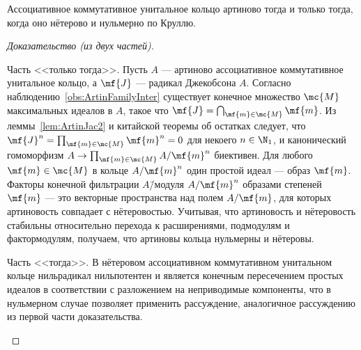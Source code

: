 \documentclass[
	extrafontsizes,
	11pt,
	hyphens,
]{memoir}
\begin{document}

\begin{theorem}
Ассоциативное коммутативное унитальное кольцо артиново тогда и только тогда, когда оно нётерово и нульмерно по Круллю.
\end{theorem}


\begin{proof}[Доказательство (из двух частей)]
~\begin{proofdescription}

\item[Часть <<только тогда>>.]
Пусть \(A\) --- артиново ассоциативное коммутативное унитальное кольцо, а \(\mf{J}\) --- радикал Джекобсона \(A\).
Согласно наблюдению~\ref{obs:ArtinFamilyInter} существует конечное множество \(\mc{M}\) максимальных идеалов в \(A\), такое что \(\mf{J} = \bigcap_{\mf{m} \in \mc{M}} \mf{m}\).
Из леммы~\ref{lem:ArtinJac2} и китайской теоремы об остатках следует, что
\(\mf{J}^n = \prod_{\mf{m} \in \mc{M}} \mf{m}^n = 0\) для некоего \(n \in \N_1\), и канонический гомоморфизм \(A \to \prod_{\mf{m} \in \mc{M}} A / \mf{m}^n\) биективен.
Для любого \(\mf{m} \in \mc{M}\) в кольце \(A / \mf{m}^n\) один простой идеал --- образ \(\mf{m}\). Факторы конечной фильтрации \(A\)\=/модуля \(A / \mf{m}^n\) образами степеней \(\mf{m}\) --- это векторные пространства над полем \(A / \mf{m}\), для которых артиновость совпадает с нётеровостью.
Учитывая, что артиновость и нётеровость стабильны относительно перехода к расширениями, подмодулям и фактормодулям, получаем, что артиновы кольца нульмерны и нётеровы.

\item[Часть <<тогда>>.]
В нётеровом ассоциативном коммутативном унитальном кольце нильрадикал нильпотентен и является конечным пересечением простых идеалов в соответствии с разложением на неприводимые компоненты, что в нульмерном случае позволяет применить рассуждение, аналогичное рассуждению из первой части доказательства.
\qedhere

\end{proofdescription}
\end{proof}
\end{document}
